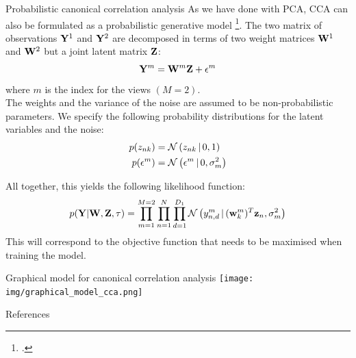 \documentclass[aspectratio=169,notes]{beamer}
\begin{document}
	\begin{frame}{Probabilistic canonical correlation analysis}
	As we have done with PCA, CCA can also be formulated as a probabilistic generative model \footcite{Bach2005}. The two matrix of observations ${\bf Y}^{1}$ and ${\bf Y}^{2}$ are decomposed in terms of two weight matrices ${\bf W}^{1}$ and ${\bf W}^{2}$ but a joint latent matrix ${\bf Z}$:
	\[
		{\bf Y}^{m} = {\bf W}^{m} {\bf Z} + \epsilon^{m}
	\]
	where $m$ is the index for the views $(M=2)$.\\
	\leavevmode\newline
	The weights and the variance of the noise are assumed to be non-probabilistic parameters. We specify the following probability distributions for the latent variables and the noise:
	\begin{align*}
		p(z_{nk}) &= \mathcal{N}\left(z_{nk} \,|\, 0,1\right)\\
		p(\epsilon^{m}) &= \mathcal{N}\left(\epsilon^{m} \,|\, 0,\sigma_{m}^2\right)
	\end{align*}
	\end{frame}

	\begin{frame}
	All together, this yields the following likelihood function:
	\[
		p({\bf Y}|{\bf W},{\bf Z},\tau) = \prod_{m=1}^{M=2} \prod_{n=1}^{N} \prod_{d=1}^{D_1} \mathcal{N}\left(y^{m}_{n,d} \,|\, ({\bf w}_{k}^{m})^T {\bf z}_{n},\sigma_{m}^2\right)
	\]
	This will correspond to the objective function that needs to be maximised when training the model.
	\end{frame}

	\begin{frame}{Graphical model for canonical correlation analysis}
	\centering
	\texttt{[image: img/graphical\_model\_cca.png]}
	\end{frame}



	
	\begin{frame}[allowframebreaks]{References}
  	\printbibliography[heading=none]
	\end{frame}
\end{document}
